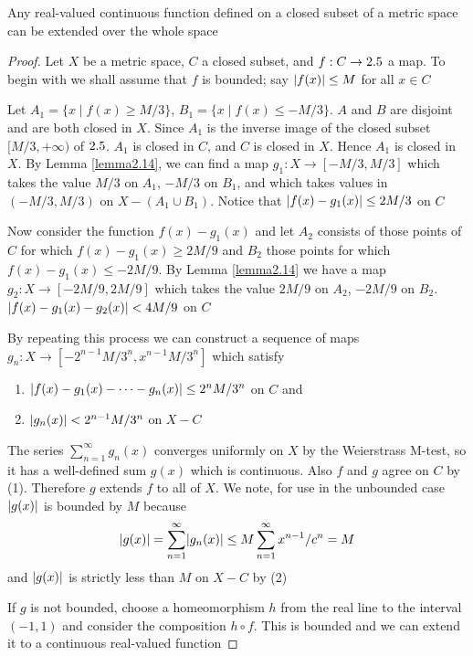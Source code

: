 \documentclass[11pt]{article}
\begin{document}
\begin{theorem}
Any real-valued continuous function defined on a closed subset of a metric
space can be extended over the whole space
\end{theorem}

\begin{proof}
Let \(X\) be a metric space, \(C\) a closed subset, and \(f:C\to2.5\) a map.
To begin with we shall assume that \(f\) is bounded; say \(\abs{f(x)}\le M\)
for all \(x\in C\)

Let \(A_1=\{x\mid f(x)\ge M/3\}\), \(B_1=\{x\mid f(x)\le -M/3\}\). \(A\) and
\(B\) are disjoint and are both closed in \(X\). Since \(A_1\) is the inverse
image of the closed subset \([M/3,+\infty)\) of \(2.5\). \(A_1\) is closed in
\(C\), and \(C\) is closed in \(X\). Hence \(A_1\) is closed in \(X\). By
Lemma \ref{lemma2.14}, we can find a map \(g_1:X\to[-M/3,M/3]\) which takes the
value \(M/3\) on \(A_1\), \(-M/3\) on \(B_1\), and which takes values in
\((-M/3,M/3)\) on \(X-(A_1\cup B_1)\). Notice that \(\abs{f(x)-g_1(x)}\le
   2M/3\) on \(C\)

Now consider the function \(f(x)-g_1(x)\) and let \(A_2\) consists of those
points of \(C\) for which \(f(x)-g_1(x)\ge2M/9\) and \(B_2\) those points for
which \(f(x)-g_1(x)\le-2M/9\). By Lemma \ref{lemma2.14} we have a map
\(g_2:X\to[-2M/9,2M/9]\) which takes the value \(2M/9\) on \(A_2\), \(-2M/9\)
on \(B_2\). \(\abs{f(x)-g_1(x)-g_2(x)}<4M/9\) on \(C\)

By repeating this process we can construct a sequence of maps
\(g_n:X\to[-2^{n-1}M/3^n,x^{n-1}M/3^n]\) which satisfy
\begin{enumerate}
\item \(\abs{f(x)-g_1(x)-\dots-g_n(x)}\le 2^nM/3^n\) on \(C\) and
\item \(\abs{g_n(x)}<2^{n-1}M/3^n\) on \(X-C\)
\end{enumerate}


The series \(\sum_{n=1}^\infty g_n(x)\) converges uniformly on \(X\) by the
Weierstrass M-test, so it has a well-defined sum \(g(x)\) which is
continuous. Also \(f\) and \(g\) agree on \(C\) by (1). Therefore \(g\)
extends \(f\) to all of \(X\). We note, for use in the unbounded case
\(\abs{g(x)}\) is bounded by \(M\) because
\begin{equation*}
\abs{g(x)}=\sum_{n=1}^\infty\abs{g_n(x)}\le M\sum_{n=1}^\infty
x^{n-1}/c^n=M
\end{equation*}
and \(\abs{g(x)}\) is strictly less than \(M\) on \(X-C\) by (2)


If \(g\) is not bounded, choose a homeomorphism \(h\) from the real line to the
interval \((-1,1)\) and consider the composition \(h\circ f\). This is
bounded and we can extend it to a continuous real-valued function
\end{proof}
\end{document}
